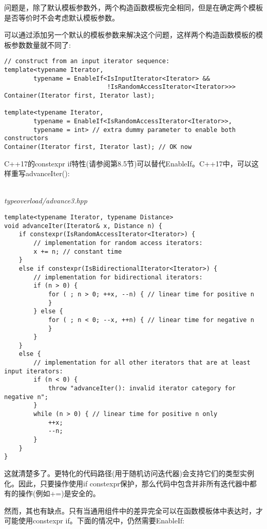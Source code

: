 问题是，除了默认模板参数外，两个构造函数模板完全相同，但是在确定两个模板是否等价时不会考虑默认模板参数。

可以通过添加另一个默认的模板参数来解决这个问题，这样两个构造函数模板的模板参数数量就不同了:

\begin{lstlisting}[style=styleCXX]
// construct from an input iterator sequence:
template<typename Iterator,
		typename = EnableIf<IsInputIterator<Iterator> &&
							!IsRandomAccessIterator<Iterator>>>
Container(Iterator first, Iterator last);

template<typename Iterator,
		typename = EnableIf<IsRandomAccessIterator<Iterator>>,
		typename = int> // extra dummy parameter to enable both constructors
Container(Iterator first, Iterator last); // OK now
\end{lstlisting}


C++17的constexpr if特性(请参阅第8.5节)可以替代EnableIf。C++17中，可以这样重写advanceIter():

\hspace*{\fill} \\ %
\noindent
\textit{typeoverload/advance3.hpp}
\begin{lstlisting}[style=styleCXX]
template<typename Iterator, typename Distance>
void advanceIter(Iterator& x, Distance n) {
	if constexpr(IsRandomAccessIterator<Iterator>) {
		// implementation for random access iterators:
		x += n; // constant time
	}
	else if constexpr(IsBidirectionalIterator<Iterator>) {
		// implementation for bidirectional iterators:
		if (n > 0) {
			for ( ; n > 0; ++x, --n) { // linear time for positive n
			}
		} else {
			for ( ; n < 0; --x, ++n) { // linear time for negative n
			}
		}
	}
	else {
		// implementation for all other iterators that are at least input iterators:
		if (n < 0) {
			throw "advanceIter(): invalid iterator category for negative n";
		}
		while (n > 0) { // linear time for positive n only
			++x;
			--n;
		}
	}
}
\end{lstlisting}

这就清楚多了。更特化的代码路径(用于随机访问迭代器)会支持它们的类型实例化。因此，只要操作使用if constexpr保护，那么代码中包含并非所有迭代器中都有的操作(例如+=)是安全的。

然而，其也有缺点。只有当通用组件中的差异完全可以在函数模板体中表达时，才可能使用constexpr if。下面的情况中，仍然需要EnableIf:

